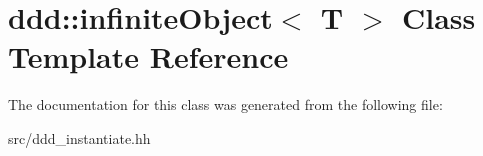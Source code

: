 \hypertarget{classddd_1_1infinite_object}{}\section{ddd\+:\+:infinite\+Object$<$ T $>$ Class Template Reference}
\label{classddd_1_1infinite_object}


The documentation for this class was generated from the following file\+:\begin{DoxyCompactItemize}
\item 
src/ddd\+\_\+instantiate.\+hh\end{DoxyCompactItemize}
